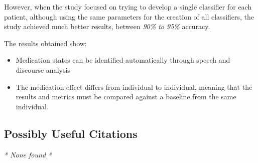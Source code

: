 \documentclass{Paper_Summary}
\begin{document}
    However, when the study focused on trying to develop a single classifier for each patient, although using the same parameters for the creation of all classifiers, the study achieved much better results, between \emph{90\% to 95\%} accuracy.

    The results obtained show:
    \begin{itemize}
        \item Medication states can be identified automatically through speech and discourse analysis
        \item The medication effect differs from individual to individual, meaning that the results and metrics must be compared against a baseline from the same individual.
    \end{itemize}

\breakline

\begin{center}
    \section*{Possibly Useful Citations}
\end{center}
\emph{* None found *}
\end{document}
